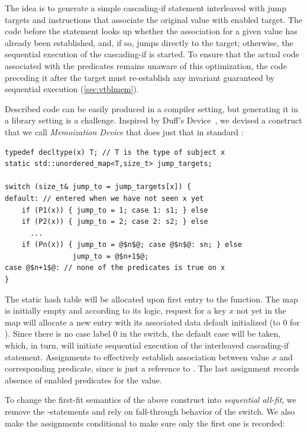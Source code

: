 The idea is to generate a simple cascading-if statement interleaved with jump 
targets and instructions that associate the original value with enabled target. 
The code before the statement looks up whether the association for a given value 
has already been established, and, if so, jumps directly to the target; otherwise, 
the sequential execution of the cascading-if is started. To ensure 
that the actual code associated with the predicates remains unaware of this 
optimization, the code preceding it after the target must re-establish any 
invariant guaranteed by sequential execution (\textsection\ref{sec:vtblmem}).

Described code can be easily produced in a compiler setting, but generating it in 
a library setting is a challenge. Inspired by Duff's Device~\cite{Duff}, 
we devised a construct that we call \emph{Memoization Device} that does just 
that in standard \Cpp{}:

\begin{lstlisting}
typedef decltype(x) T; // T is the type of subject x
static std::unordered_map<T,size_t> jump_targets;

switch (size_t& jump_to = jump_targets[x]) {
default: // entered when we have not seen x yet
    if (P1(x)) { jump_to = 1; case 1: s1; } else 
    if (P2(x)) { jump_to = 2; case 2: s2; } else
      ...
    if (Pn(x)) { jump_to = @$n$@; case @$n$@: sn; } else
                jump_to = @$n+1$@;
case @$n+1$@: // none of the predicates is true on x
}
\end{lstlisting}

\noindent
The static  hash table will be allocated upon first entry 
to the function. The map is initially empty and according to its logic, 
request for a key $x$ not yet in the map will allocate a 
new entry with its associated data default initialized (to 0 for ). Since 
there is no case label 0 in the switch, the default case will be taken, which, in 
turn, will initiate sequential execution of the interleaved cascading-if 
statement. Assignments to  effectively establish association 
between value $x$ and corresponding predicate, since  is just a 
reference to . The last assignment records absence of 
enabled predicates for the value.

To change the first-fit semantics of the above construct into \emph{sequential 
all-fit}, we remove the -statements and rely on fall-through behavior of the 
switch. We also make the assignments conditional to make sure only the first one 
is recorded:

